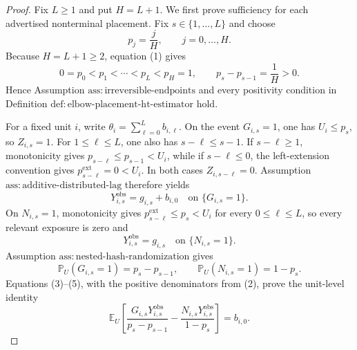 \documentclass{article}
\begin{document}
\begin{proof}
Fix \(L\geq1\) and put \(H=L+1\).  We first prove sufficiency for each advertised nonterminal placement.  Fix \(s\in\{1,\ldots,L\}\) and choose
\[
 p_j=\frac{j}{H},\qquad j=0,\ldots,H.
\tag{1}
\]
Because \(H=L+1\geq2\), equation (1) gives
\[
 0=p_0<p_1<\cdots<p_L<p_H=1,
 \qquad
 p_s-p_{s-1}=\frac1H>0.
\tag{2}
\]
Hence Assumption \(\mathrm{ass:irreversible\text{-}endpoints}\) and every positivity condition in Definition \(\mathrm{def:elbow\text{-}placement\text{-}ht\text{-}estimator}\) hold.

For a fixed unit \(i\), write \(\theta_i=\sum_{\ell=0}^{L}b_{i,\ell}\).  On the event \(G_{i,s}=1\), one has \(U_i\leq p_s\), so \(Z_{i,s}=1\).  For \(1\leq\ell\leq L\), one also has \(s-\ell\leq s-1\).  If \(s-\ell\geq1\), monotonicity gives \(p_{s-\ell}\leq p_{s-1}<U_i\), while if \(s-\ell\leq0\), the left-extension convention gives \(p^{\mathrm{ext}}_{s-\ell}=0<U_i\).  In both cases \(Z_{i,s-\ell}=0\).  Assumption \(\mathrm{ass:additive\text{-}distributed\text{-}lag}\) therefore yields
\[
 Y^{\mathrm{obs}}_{i,s}=g_{i,s}+b_{i,0}
 \quad\text{on }\{G_{i,s}=1\}.
\tag{3}
\]
On \(N_{i,s}=1\), monotonicity gives \(p^{\mathrm{ext}}_{s-\ell}\leq p_s<U_i\) for every \(0\leq\ell\leq L\), so every relevant exposure is zero and
\[
 Y^{\mathrm{obs}}_{i,s}=g_{i,s}
 \quad\text{on }\{N_{i,s}=1\}.
\tag{4}
\]
Assumption \(\mathrm{ass:nested\text{-}hash\text{-}randomization}\) gives
\[
 \mathbb P_U(G_{i,s}=1)=p_s-p_{s-1},
 \qquad
 \mathbb P_U(N_{i,s}=1)=1-p_s.
\tag{5}
\]
Equations (3)--(5), with the positive denominators from (2), prove the unit-level identity
\[
 \mathbb E_U\!\left[
 \frac{G_{i,s}Y^{\mathrm{obs}}_{i,s}}{p_s-p_{s-1}}
 -\frac{N_{i,s}Y^{\mathrm{obs}}_{i,s}}{1-p_s}
 \right]
 =b_{i,0}.
\tag{6}
\]


\end{proof}
\end{document}
